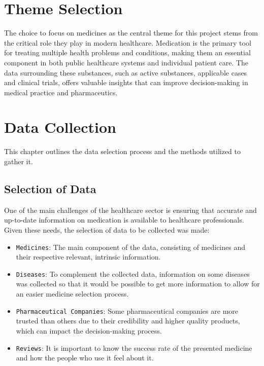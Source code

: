 \documentclass[sigconf]{acmart}
\begin{document}
\section{Theme Selection}

The choice to focus on medicines as the central theme for this project stems from the critical role they play in modern healthcare. Medication is the primary tool for treating multiple health problems and conditions, making them an essential component in both public healthcare systems and individual patient care. The data surrounding these substances, such as active substances, applicable cases and clinical trials, offers valuable insights that can improve decision-making in medical practice and pharmaceutics.

\section{Data Collection}

This chapter outlines the data selection process and the methods utilized to gather it.

\subsection{Selection of Data}

One of the main challenges of the healthcare sector is ensuring that accurate and up-to-date information on medication is available to healthcare professionals. Given these needs, the selection of data to be collected was made:

\begin{itemize}
	\item {\texttt{Medicines}}: The main component of the data, consisting of medicines and their respective relevant, intrinsic information.
	\item {\texttt{Diseases}}: To complement the collected data, information on some diseases was collected so that it would be possible to get more information to allow for an easier medicine selection process.
	\item {\texttt{Pharmaceutical Companies}}: Some pharmaceutical companies are more trusted than others due to their credibility and higher quality products, which can impact the decision-making process.
	\item {\texttt{Reviews}}: It is important to know the success rate of the presented medicine and how the people who use it feel about it.
\end{itemize}
\end{document}
